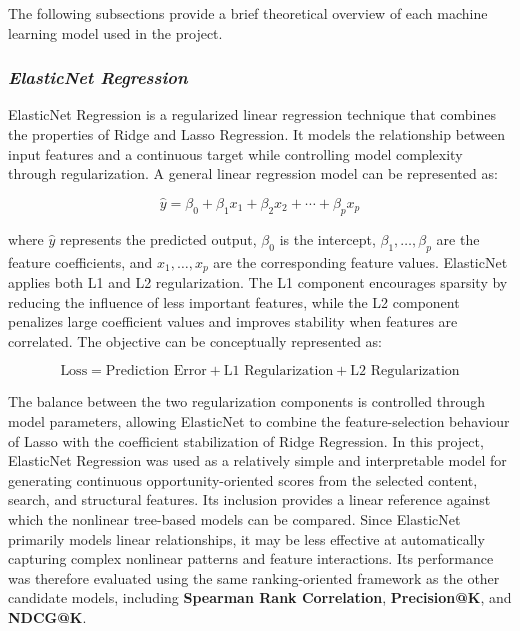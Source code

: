 \documentclass[12pt,a4paper]{report}
\begin{document}
The following subsections provide a brief theoretical overview of each machine learning model used in the project.

\subsubsection{\textit{ElasticNet Regression}}
ElasticNet Regression is a regularized linear regression technique that combines the properties of Ridge and Lasso Regression. It models the relationship between input features and a continuous target while controlling model complexity through regularization. A general linear regression model can be represented as:

\begin{equation}
\hat{y} = \beta_0 + \beta_1x_1 + \beta_2x_2 + \cdots + \beta_px_p
\end{equation}

where $\hat{y}$ represents the predicted output, $\beta_0$ is the intercept, $\beta_1,\ldots,\beta_p$ are the feature coefficients, and $x_1,\ldots,x_p$ are the corresponding feature values. ElasticNet applies both L1 and L2 regularization. The L1 component encourages sparsity by reducing the influence of less important features, while the L2 component penalizes large coefficient values and improves stability when features are correlated. The objective can be conceptually represented as:

\begin{equation}
\text{Loss} =
\text{Prediction Error}
+
\text{L1 Regularization}
+
\text{L2 Regularization}
\end{equation}

The balance between the two regularization components is controlled through model parameters, allowing ElasticNet to combine the feature-selection behaviour of Lasso with the coefficient stabilization of Ridge Regression. In this project, ElasticNet Regression was used as a relatively simple and interpretable model for generating continuous opportunity-oriented scores from the selected content, search, and structural features. Its inclusion provides a linear reference against which the nonlinear tree-based models can be compared. Since ElasticNet primarily models linear relationships, it may be less effective at automatically capturing complex nonlinear patterns and feature interactions. Its performance was therefore evaluated using the same ranking-oriented framework as the other candidate models, including \textbf{Spearman Rank Correlation}, \textbf{Precision@K}, and \textbf{NDCG@K}.
\end{document}
